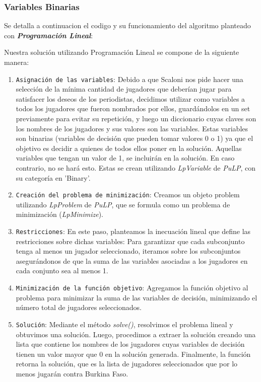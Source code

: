 \subsubsection{Variables Binarias}

Se detalla a continuacion el codigo y su funcionamiento del algoritmo planteado con \textbf{\textit{Programación Lineal}}:



Nuestra solución utilizando Programación Lineal se compone de la siguiente manera:
\begin{enumerate}
    \item \texttt{Asignación de las variables}: Debido a que Scaloni nos pide hacer una selección de la mínima cantidad de jugadores que deberían jugar para satisfacer los deseos de los periodistas, decidimos utilizar como variables a todos los jugadores que fueron nombrados por ellos, guardándolos en un set previamente para evitar su repetición, y luego un diccionario cuyas claves son los nombres de los jugadores y sus valores son las variables. Estas variables son binarias (variables de decisión que pueden tomar valores 0 o 1) ya que el objetivo es decidir a quienes de todos ellos poner en la solución. Aquellas variables que tengan un valor de 1, se incluirán en la solución. En caso contrario, no se hará esto. Estas se crean utilizando \textit{LpVariable} de \textit{PuLP}, con su categoría en 'Binary'.

    \item \texttt{Creación del problema de minimización}: Creamos un objeto problem utilizando \textit{LpProblem} de \textit{PuLP}, que se formula como un problema de minimización (\textit{LpMinimize}).

    \item \texttt{Restricciones}: En este paso, planteamos la inecuación lineal que define las restricciones sobre dichas variables:
   	 Para garantizar que cada subconjunto tenga al menos un jugador seleccionado, iteramos sobre los subconjuntos asegurándonos de que la suma de las variables asociadas a los jugadores en cada conjunto sea al menos 1.

    \item \texttt{Minimización de la función objetivo}: Agregamos la función objetivo al problema para minimizar la suma de las variables de decisión, minimizando el número total de jugadores seleccionados.

    \item \texttt{Solución}: Mediante el método \textit{solve()}, resolvimos el problema lineal y obtuvimos una solución.    Luego, procedimos a extraer la solución creando una lista que contiene los nombres de los jugadores cuyas variables de decisión tienen un valor mayor que 0 en la solución generada.
    Finalmente, la función retorna la solución, que es la lista de jugadores seleccionados que por lo menos jugarán contra Burkina Faso.
\end{enumerate}

